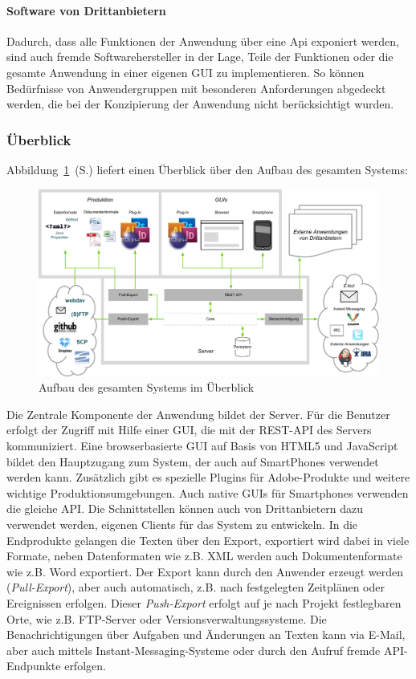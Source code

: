 \paragraph{Software von Drittanbietern} Dadurch, dass alle Funktionen der Anwendung über eine Api exponiert werden, sind auch fremde Softwarehersteller in der Lage, Teile der Funktionen oder die gesamte Anwendung in einer eigenen GUI zu implementieren. So können Bedürfnisse von Anwendergruppen mit besonderen Anforderungen abgedeckt werden, die bei der Konzipierung der Anwendung nicht berücksichtigt wurden.

\subsubsection{Überblick}

Abbildung~\ref{chart:gesamtessystem}~(S.\pageref{chart:gesamtessystem}) liefert einen Überblick über den Aufbau des gesamten Systems:

\begin{figure}[htb]
\begin{center}
\includegraphics[width=\textwidth]{media/GesamtesSystem.pdf}
\caption{Aufbau des gesamten Systems im Überblick}
\label{chart:gesamtessystem}
\end{center}
\end{figure}

Die Zentrale Komponente der Anwendung bildet der Server. Für die Benutzer erfolgt der Zugriff mit Hilfe einer GUI, die mit der REST-API des Servers kommuniziert. Eine browserbasierte GUI auf Basis von HTML5 und JavaScript bildet den Hauptzugang zum System, der auch auf SmartPhones verwendet werden kann. Zusätzlich gibt es spezielle Plugins für Adobe-Produkte und weitere wichtige Produktionsumgebungen. Auch native GUIs für Smartphones verwenden die gleiche API. Die Schnittstellen können auch von Drittanbietern dazu verwendet werden, eigenen Clients für das System zu entwickeln. In die Endprodukte gelangen die Texten über den Export, exportiert wird dabei in viele Formate, neben Datenformaten wie z.B. XML werden auch Dokumentenformate wie z.B. Word exportiert. Der Export kann durch den Anwender erzeugt werden (\emph{Pull-Export}), aber auch automatisch, z.B. nach festgelegten Zeitplänen oder Ereignissen erfolgen. Dieser \emph{Push-Export} erfolgt auf je nach Projekt festlegbaren Orte, wie z.B. FTP-Server oder Versionsverwaltungssysteme. Die Benachrichtigungen über Aufgaben und Änderungen an Texten kann via E-Mail, aber auch mittels Instant-Messaging-Systeme oder durch den Aufruf fremde API-Endpunkte erfolgen.
